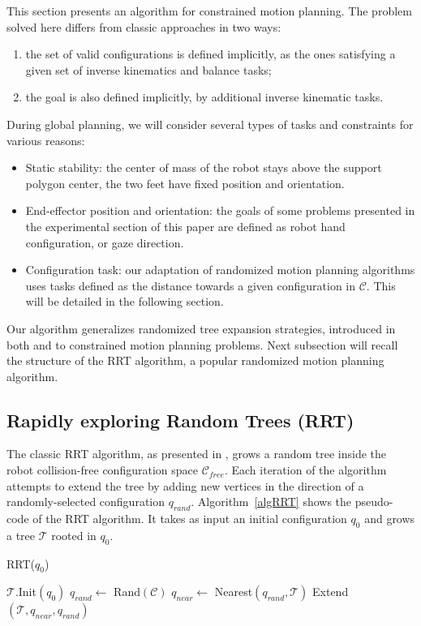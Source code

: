 \documentclass{article}
\begin{document}
This section presents an algorithm for constrained motion planning. 
The problem solved here
differs from classic approaches in two ways:
\begin{enumerate}
\item the set of valid configurations is defined implicitly, as the ones satisfying a given 
  set of inverse kinematics and balance tasks;
\item the goal is also defined implicitly, by additional inverse kinematic tasks.
\end{enumerate}
During global planning, we will consider several types of
tasks and constraints for various reasons:
\begin{itemize}
\item Static stability: the center of mass of the robot stays above
  the support polygon center, the two feet have fixed position and
  orientation.
\item End-effector position and orientation: the goals of some problems presented
  in the experimental section of this paper are defined as robot hand configuration,
  or gaze direction.
\item Configuration task: our adaptation of randomized motion planning algorithms 
  uses tasks defined as the distance towards a given configuration in $\mathcal{C}$. 
  This will be detailed in the following section.
\end{itemize}


Our algorithm generalizes randomized tree expansion strategies, introduced in both \cite{HsuLat99c} and
\cite{kuffner00rrtconnect} to constrained motion planning problems. Next subsection will recall the structure of the RRT algorithm,
a popular randomized motion planning algorithm.


\subsection{Rapidly exploring Random Trees (RRT)}

The classic RRT algorithm, as presented in  \cite{kuffner00rrtconnect}, grows 
a random tree inside the robot 
collision-free configuration space 
$\mathcal{C}_{free}$. Each iteration of the algorithm attempts to extend the tree
by adding new vertices in the direction of a randomly-selected configuration
$q_{rand}$. Algorithm~\ref{algRRT} shows the pseudo-code of the RRT algorithm.
It takes as input an initial configuration $q_0$ and grows a tree  $\mathcal{T}$ rooted 
in $q_0$. 

\begin{algorithm}
\caption{RRT($q_0$)}
\label{algRRT}
\begin{algorithmic}
\STATE $\mathcal{T}.$Init$(q_0)$
\STATE $q_{rand} \leftarrow $ Rand$(\mathcal{C})$
\STATE $q_{near} \leftarrow $ Nearest$(q_{rand},\mathcal{T})$
\STATE Extend$(\mathcal{T},q_{near},q_{rand})$
\ENDFOR

\end{algorithmic}
\end{algorithm}
\end{document}
